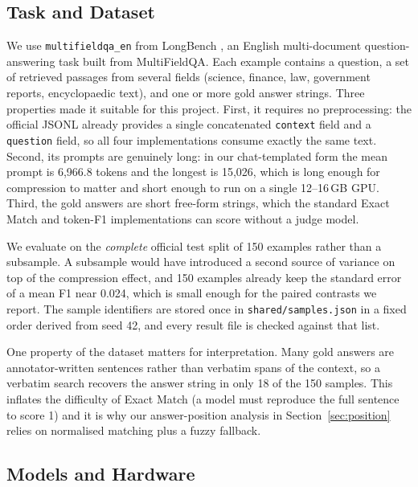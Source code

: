 \documentclass[10pt,a4paper,twocolumn]{article}
\begin{document}
\subsection{Task and Dataset}

We use \texttt{multifieldqa\_en} from LongBench \citep{bai-etal-2024-longbench},
an English multi-document question-answering task built from MultiFieldQA. Each
example contains a question, a set of retrieved passages from several fields
(science, finance, law, government reports, encyclopaedic text), and one or more
gold answer strings. Three properties made it suitable for this project. First, it
requires no preprocessing: the official JSONL already provides a single
concatenated \texttt{context} field and a \texttt{question} field, so all four
implementations consume exactly the same text. Second, its prompts are genuinely
long: in our chat-templated form the mean prompt is 6{,}966.8 tokens and the
longest is 15{,}026, which is long enough for compression to matter and short
enough to run on a single 12--16\,GB GPU. Third, the gold answers are short
free-form strings, which the standard Exact Match and token-F1 implementations can
score without a judge model.

We evaluate on the \emph{complete} official test split of 150 examples rather than
a subsample. A subsample would have introduced a second source of variance on top
of the compression effect, and 150 examples already keep the standard error of a
mean F1 near 0.024, which is small enough for the paired contrasts we report. The
sample identifiers are stored once in \texttt{shared/samples.json} in a fixed
order derived from seed 42, and every result file is checked against that list.

One property of the dataset matters for interpretation. Many gold answers are
annotator-written sentences rather than verbatim spans of the context, so a
verbatim search recovers the answer string in only 18 of the 150 samples. This
inflates the difficulty of Exact Match (a model must reproduce the full sentence
to score 1) and it is why our answer-position analysis in
Section~\ref{sec:position} relies on normalised matching plus a fuzzy fallback.

\subsection{Models and Hardware}
\end{document}
